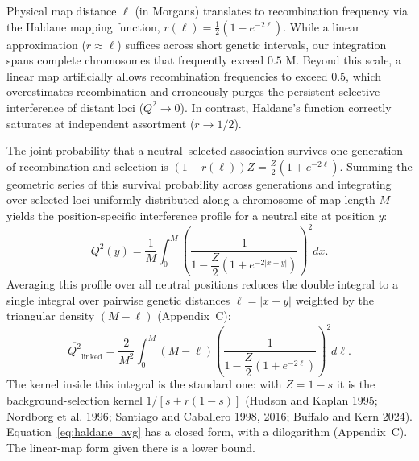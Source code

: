 \documentclass[12pt]{article}
\begin{document}
Physical map distance $\ell$ (in Morgans) translates to recombination frequency via the Haldane mapping function, $r(\ell) = \frac{1}{2}(1 - e^{-2\ell})$. While a linear approximation ($r \approx \ell$) suffices across short genetic intervals, our integration spans complete chromosomes that frequently exceed $0.5\text{ M}$. Beyond this scale, a linear map artificially allows recombination frequencies to exceed $0.5$, which overestimates recombination and erroneously purges the persistent selective interference of distant loci ($Q^2 \to 0$). In contrast, Haldane's function correctly saturates at independent assortment ($r \to 1/2$).

The joint probability that a neutral--selected association survives one generation of recombination and selection is $(1 - r(\ell))Z = \frac{Z}{2}(1 + e^{-2\ell})$. Summing the geometric series of this survival probability across generations and integrating over selected loci uniformly distributed along a chromosome of map length $M$ yields the position-specific interference profile for a neutral site at position $y$:
\begin{equation}
Q^2(y) = \frac{1}{M}\int_0^M \left(\frac{1}{1 - \dfrac{Z}{2}(1 + e^{-2|x-y|})}\right)^2 dx.
\end{equation}
Averaging this profile over all neutral positions reduces the double integral to a single integral over pairwise genetic distances $\ell = |x - y|$ weighted by the triangular density $(M - \ell)$ (Appendix~C):
\begin{equation}
\overline{Q^2}_\text{linked} = \frac{2}{M^2}\int_0^M (M - \ell)\left(\frac{1}{1 - \dfrac{Z}{2}(1 + e^{-2\ell})}\right)^2 d\ell. \label{eq:haldane_avg}
\end{equation}
The kernel inside this integral is the standard one: with $Z = 1 - s$ it is the background-selection kernel $1/[s + r(1-s)]$ (Hudson and Kaplan 1995; Nordborg et al. 1996; Santiago and Caballero 1998, 2016; Buffalo and Kern 2024). Equation~\eqref{eq:haldane_avg} has a closed form, with a dilogarithm (Appendix~C). The linear-map form given there is a lower bound.
\end{document}
